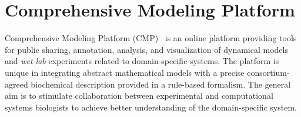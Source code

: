 \documentclass[12pt]{fithesis2}
\begin{document}
\section{Comprehensive Modeling Platform}
\label{cmp}

Comprehensive Modeling Platform (CMP)~\cite{cs2bio2013} is an online platform providing tools for public sharing, annotation, analysis, and visualization of dynamical models and \emph{wet-lab} experiments related to domain-specific systems. The platform is unique in integrating abstract mathematical models with a precise consortium-agreed biochemical description provided in a rule-based formalism. The general aim is to stimulate collaboration between experimental and computational systems biologists to achieve better understanding of the domain-specific system.

\begin{figure}[!h]
\begin{center}
\end{center}
\end{figure}
\end{document}
